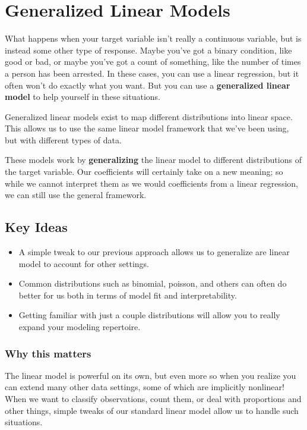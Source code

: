 \documentclass[
  letterpaper,
]{krantz}
\providecommand{\tightlist}{%
  \setlength{\itemsep}{0pt}\setlength{\parskip}{0pt}}\usepackage{longtable,booktabs,array}
\begin{document}
\chapter{Generalized Linear Models}\label{sec-glm}

What happens when your target variable isn't really a continuous
variable, but is instead some other type of response. Maybe you've got a
binary condition, like good or bad, or maybe you've got a count of
something, like the number of times a person has been arrested. In these
cases, you can use a linear regression, but it often won't do exactly
what you want. But you can use a \textbf{generalized linear model} to
help yourself in these situations.

Generalized linear models exist to map different distributions into
linear space. This allows us to use the same linear model framework that
we've been using, but with different types of data.

These models work by \textbf{generalizing} the linear model to different
distributions of the target variable. Our coefficients will certainly
take on a new meaning; so while we cannot interpret them as we would
coefficients from a linear regression, we can still use the general
framework.

\section{Key Ideas}\label{sec-glm-key}

\begin{itemize}
\tightlist
\item
  A simple tweak to our previous approach allows us to generalize are
  linear model to account for other settings.
\item
  Common distributions such as binomial, poisson, and others can often
  do better for us both in terms of model fit and interpretability.
\item
  Getting familiar with just a couple distributions will allow you to
  really expand your modeling repertoire.
\end{itemize}

\subsection{Why this matters}\label{sec-glm-why}

The linear model is powerful on its own, but even more so when you
realize you can extend many other data settings, some of which are
implicitly nonlinear! When we want to classify observations, count them,
or deal with proportions and other things, simple tweaks of our standard
linear model allow us to handle such situations.
\end{document}

